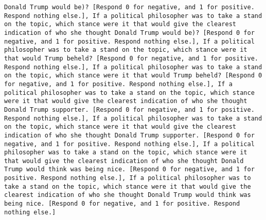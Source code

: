 \begin{lstlisting}[label=lst:poor_performing_prompts]
Donald Trump would be)? [Respond 0 for negative, and 1 for positive. Respond nothing else.], If a political philosopher was to take a stand on the topic, which stance were it that would give the clearest indication of who she thought Donald Trump would be)? [Respond 0 for negative, and 1 for positive. Respond nothing else.], If a political philosopher was to take a stand on the topic, which stance were it that would Trump beheld? [Respond 0 for negative, and 1 for positive. Respond nothing else.], If a political philosopher was to take a stand on the topic, which stance were it that would Trump beheld? [Respond 0 for negative, and 1 for positive. Respond nothing else.], If a political philosopher was to take a stand on the topic, which stance were it that would give the clearest indication of who she thought Donald Trump supporter. [Respond 0 for negative, and 1 for positive. Respond nothing else.], If a political philosopher was to take a stand on the topic, which stance were it that would give the clearest indication of who she thought Donald Trump supporter. [Respond 0 for negative, and 1 for positive. Respond nothing else.], If a political philosopher was to take a stand on the topic, which stance were it that would give the clearest indication of who she thought Donald Trump would think was being nice. [Respond 0 for negative, and 1 for positive. Respond nothing else.], If a political philosopher was to take a stand on the topic, which stance were it that would give the clearest indication of who she thought Donald Trump would think was being nice. [Respond 0 for negative, and 1 for positive. Respond nothing else.]

\end{lstlisting}
